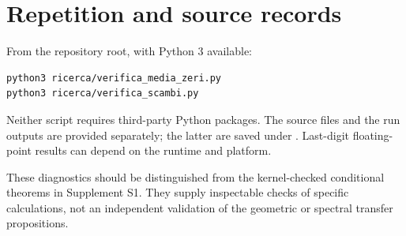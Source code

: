 \documentclass[11pt,a4paper]{article}
\begin{document}
\section{Repetition and source records}
From the repository root, with Python 3 available:
\begin{verbatim}
python3 ricerca/verifica_media_zeri.py
python3 ricerca/verifica_scambi.py
\end{verbatim}
Neither script requires third-party Python packages. The source files and
the run outputs are provided separately; the latter are saved under
. Last-digit floating-point results can depend on
the runtime and platform.

These diagnostics should be distinguished from the kernel-checked
conditional theorems in Supplement S1. They supply inspectable checks of
specific calculations, not an independent validation of the geometric or
spectral transfer propositions.
\end{document}
